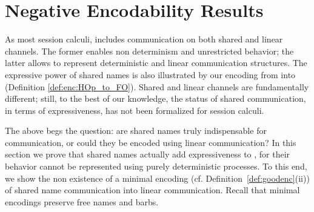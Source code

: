 \section{Negative Encodability Results}\label{s:negative}

%

As most session calculi, 
\HOp includes communication on both shared and linear channels.
The former enables non determinism and unrestricted behavior; the latter allows to represent
deterministic and linear communication structures.
The expressive power of shared names is also illustrated by our 
encoding from \HOp into \sessp (Definition \ref{def:enc:HOp_to_FO}).
Shared and linear channels are fundamentally different; still, to the best of our knowledge,
the status of shared communication, in terms of expressiveness, has not been formalized for session calculi.

The above begs the question: are shared names truly indispensable for communication, or could they
be encoded using linear communication?
In this section we prove that shared names actually add expressiveness to \HOp,
for their behavior cannot be represented using purely deterministic processes.
To this end, we show the non existence of a minimal encoding 
(cf. Definition~\ref{def:goodenc}(ii))
of shared name communication into linear 
communication. Recall that minimal encodings preserve free names and barbs.

%
%
%



